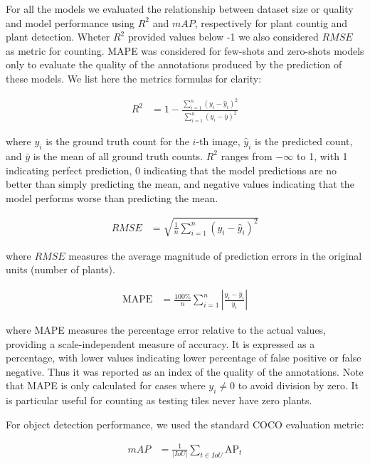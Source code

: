 \documentclass[12pt,a4paper,oneside]{report}
\begin{document}
For all the models we evaluated the relationship between dataset size or quality and model performance
using $R^2$ and $mAP$, respectively for plant countig and plant detection. Wheter 
$R^2$ provided values below -1 we also considered $RMSE$ as metric for counting.
MAPE was considered for few-shots and zero-shots models only to evaluate the 
quality of the annotations produced by the prediction of these models.
We list here the metrics formulas for clarity:

\begin{align}
R^2 &= 1 - \frac{\sum_{i=1}^{n} (y_i - \hat{y}_i)^2}{\sum_{i=1}^{n} (y_i - \bar{y})^2}
\end{align}

where $y_i$ is the ground truth count for the $i$-th image, $\hat{y}_i$ is the 
predicted count, and $\bar{y}$ is the mean of all ground truth counts. $R^2$ ranges 
from $-\infty$ to 1, with 1 indicating perfect prediction, 0 indicating that the 
model predictions are no better than simply predicting the mean, and negative 
values indicating that the model performs worse than predicting the mean.

\begin{align}
\text{$RMSE$} &= \sqrt{\frac{1}{n}\sum_{i=1}^{n} (y_i - \hat{y}_i)^2}
\end{align}

where $RMSE$ measures the average magnitude of prediction errors in the original 
units (number of plants).

\begin{align}
\text{MAPE} &= \frac{100\%}{n}\sum_{i=1}^{n} \left| \frac{y_i - \hat{y}_i}{y_i} \right|
\end{align}

where MAPE measures the percentage error relative to the actual values, providing a scale-independent 
measure of accuracy. It is expressed as a percentage, with lower values indicating lower
percentage of false positive or false negative.
Thus it was reported as an index of the quality of the annotations.
Note that MAPE is only calculated for cases where $y_i \neq 0$ to avoid division by zero.
It is particular useful for counting as testing tiles never have zero plants.

For object detection performance, we used the standard COCO evaluation metric:

\begin{align}
\text{$mAP$} &= \frac{1}{|IoU|}\sum_{t \in IoU}\text{AP}_t
\end{align}
\end{document}
